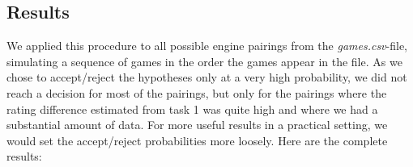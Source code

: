 \subsection{Results}
We applied this procedure to all possible engine pairings from the \textit{games.csv}-file, simulating a sequence of games in the order the games appear in the file. As we chose to accept/reject the hypotheses only at a very high probability, we did not reach a decision for most of the pairings, but only for the pairings where the rating difference estimated from task 1 was quite high and where we had a substantial amount of data. For more useful results in a practical setting, we would set the accept/reject probabilities more loosely. Here are the complete results:
\begin{table}[htbp]
    \centering
    \caption{Results of Task 4}
    \label{tab:full_sequential}
    \small 
    \renewcommand{\arraystretch}{1.5}
    \setlength{\tabcolsep}{3pt} 
    

\end{table}
